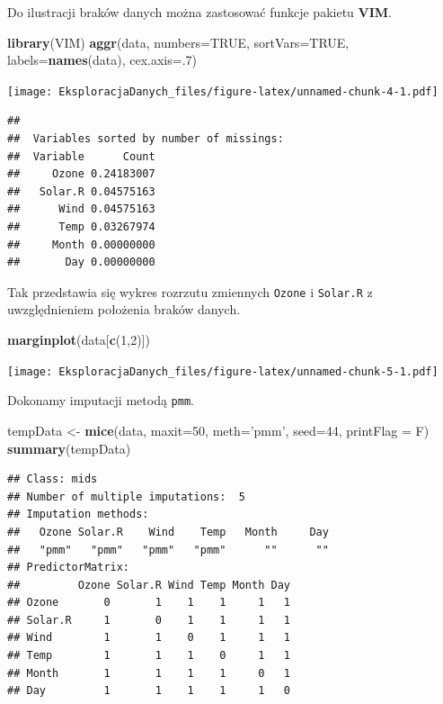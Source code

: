 \documentclass[]{book}
\newenvironment{Shaded}{\begin{snugshade}}{\end{snugshade}}
\newcommand{\DataTypeTok}[1]{\textcolor[rgb]{0.13,0.29,0.53}{#1}}
\newcommand{\DecValTok}[1]{\textcolor[rgb]{0.00,0.00,0.81}{#1}}
\newcommand{\KeywordTok}[1]{\textcolor[rgb]{0.13,0.29,0.53}{\textbf{#1}}}
\newcommand{\NormalTok}[1]{#1}
\newcommand{\OtherTok}[1]{\textcolor[rgb]{0.56,0.35,0.01}{#1}}
\newcommand{\StringTok}[1]{\textcolor[rgb]{0.31,0.60,0.02}{#1}}
\theoremstyle{plain}
\theoremstyle{definition}
\theoremstyle{definition}
\theoremstyle{definition}
\theoremstyle{definition}
\theoremstyle{remark}
\begin{document}
Do ilustracji braków danych można zastosować funkcje pakietu \textbf{VIM}.

\begin{Shaded}
\begin{Highlighting}[]
\KeywordTok{library}\NormalTok{(VIM)}
\KeywordTok{aggr}\NormalTok{(data, }\DataTypeTok{numbers=}\OtherTok{TRUE}\NormalTok{, }
     \DataTypeTok{sortVars=}\OtherTok{TRUE}\NormalTok{, }
     \DataTypeTok{labels=}\KeywordTok{names}\NormalTok{(data), }
     \DataTypeTok{cex.axis=}\NormalTok{.}\DecValTok{7}\NormalTok{)}
\end{Highlighting}
\end{Shaded}

\texttt{[image: EksploracjaDanych\_files/figure-latex/unnamed-chunk-4-1.pdf]}

\begin{verbatim}
## 
##  Variables sorted by number of missings: 
##  Variable      Count
##     Ozone 0.24183007
##   Solar.R 0.04575163
##      Wind 0.04575163
##      Temp 0.03267974
##     Month 0.00000000
##       Day 0.00000000
\end{verbatim}

Tak przedstawia się wykres rozrzutu zmiennych \texttt{Ozone} i \texttt{Solar.R} z uwzględnieniem położenia braków danych.

\begin{Shaded}
\begin{Highlighting}[]
\KeywordTok{marginplot}\NormalTok{(data[}\KeywordTok{c}\NormalTok{(}\DecValTok{1}\NormalTok{,}\DecValTok{2}\NormalTok{)])}
\end{Highlighting}
\end{Shaded}

\texttt{[image: EksploracjaDanych\_files/figure-latex/unnamed-chunk-5-1.pdf]}

Dokonamy imputacji metodą \texttt{pmm}.

\begin{Shaded}
\begin{Highlighting}[]
\NormalTok{tempData <-}\StringTok{ }\KeywordTok{mice}\NormalTok{(data, }
                 \DataTypeTok{maxit=}\DecValTok{50}\NormalTok{, }
                 \DataTypeTok{meth=}\StringTok{'pmm'}\NormalTok{, }
                 \DataTypeTok{seed=}\DecValTok{44}\NormalTok{, }
                 \DataTypeTok{printFlag =}\NormalTok{ F)}
\KeywordTok{summary}\NormalTok{(tempData)}
\end{Highlighting}
\end{Shaded}

\begin{verbatim}
## Class: mids
## Number of multiple imputations:  5 
## Imputation methods:
##   Ozone Solar.R    Wind    Temp   Month     Day 
##   "pmm"   "pmm"   "pmm"   "pmm"      ""      "" 
## PredictorMatrix:
##         Ozone Solar.R Wind Temp Month Day
## Ozone       0       1    1    1     1   1
## Solar.R     1       0    1    1     1   1
## Wind        1       1    0    1     1   1
## Temp        1       1    1    0     1   1
## Month       1       1    1    1     0   1
## Day         1       1    1    1     1   0
\end{verbatim}
\end{document}
